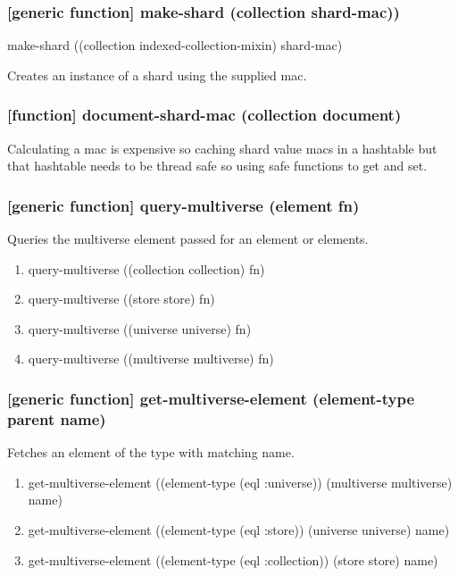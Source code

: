 \documentclass[11pt]{article}
\begin{document}
\subsubsection{[generic function] make-shard (collection shard-mac))}
\label{sec:org8602c2d}
make-shard ((collection indexed-collection-mixin) shard-mac)

Creates an instance of a shard using the supplied mac.

\subsubsection{[function] document-shard-mac (collection document)}
\label{sec:org9d7c2bd}

Calculating a mac is expensive so caching shard value macs in a
hashtable but that hashtable needs to be thread safe so using safe
functions to get and set.

\subsubsection{[generic function] query-multiverse (element fn)}
\label{sec:orgfd9168a}

Queries the multiverse element passed for an element or elements.

\begin{enumerate}
\item query-multiverse ((collection collection) fn)
\label{sec:orgb1f19d5}

\item query-multiverse ((store store) fn)
\label{sec:org9b7bf39}

\item query-multiverse ((universe universe) fn)
\label{sec:org0f370ef}

\item query-multiverse ((multiverse multiverse) fn)
\label{sec:org0cb654b}
\end{enumerate}

\subsubsection{[generic function] get-multiverse-element (element-type parent name)}
\label{sec:org8fde332}

Fetches an element of the type with matching name.

\begin{enumerate}
\item get-multiverse-element ((element-type (eql :universe)) (multiverse multiverse) name)
\label{sec:org6c34042}

\item get-multiverse-element ((element-type (eql :store)) (universe universe) name)
\label{sec:org5a7e8c1}

\item get-multiverse-element ((element-type (eql :collection)) (store store) name)
\label{sec:org95db810}
\end{enumerate}
\end{document}
